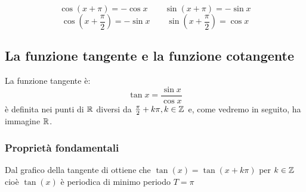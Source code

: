 \[\cos(x+\pi)=-\cos x \qquad \sin(x+\pi)=-\sin x\]
\[\cos(x+\frac{\pi}{2})=-\sin x \qquad \sin(x+\frac{\pi}{2})=\cos x \]

\subsection{La funzione tangente e la funzione cotangente}
La funzione tangente è:
\[\tan x = \frac{\sin x}{\cos x}\]
è definita nei punti di $\mathbb{R}$ diversi da $\frac{\pi}{2} +k\pi,k\in\mathbb{Z}$ e, come vedremo in seguito, ha immagine $\mathbb{R}$.

\subsubsection{Proprietà fondamentali}
Dal grafico della tangente di ottiene che $\tan(x)=\tan(x+k\pi)$ per $k\in \mathbb{Z}$ cioè $\tan(x)$ è periodica di minimo periodo $T=\pi$

\begin{figure}[bth]
\myfloatalign
{} 
\end{figure}